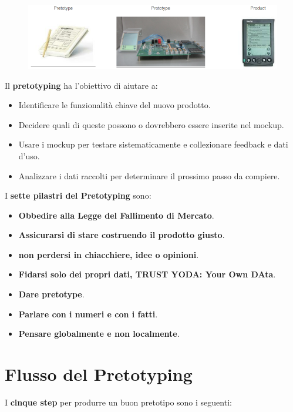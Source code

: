 \documentclass[a4paper,11pt,oneside]{book}
\begin{document}
\pagebreak

\begin{figure}[!h]
	\centering
	\includegraphics[scale=0.65]{immagini/Pre_prot.png}
\end{figure}

Il \textbf{pretotyping} ha l'obiettivo di aiutare a:

\begin{itemize}
	\item Identificare le funzionalità chiave del nuovo prodotto.
	\item Decidere quali di queste possono o dovrebbero essere inserite nel mockup.
	\item Usare i mockup per testare sistematicamente e collezionare feedback e dati d'uso.
	\item Analizzare i dati raccolti per determinare il prossimo passo da compiere.
\end{itemize}

I \textbf{sette pilastri del Pretotyping} sono:

\begin{itemize}
	\item \textbf{Obbedire alla Legge del Fallimento di Mercato}.
	\item \textbf{Assicurarsi di stare costruendo il prodotto giusto}.
	\item \textbf{non perdersi in chiacchiere, idee o opinioni}.
	\item \textbf{Fidarsi solo dei propri dati, \textbf{TRUST YODA: Your Own DAta}}.
	\item \textbf{Dare pretotype}.
	\item \textbf{Parlare con i numeri e con i fatti}.
	\item \textbf{Pensare globalmente e non localmente}.
\end{itemize}

\section{Flusso del Pretotyping}

I \textbf{cinque step} per produrre un buon pretotipo sono i seguenti:
\end{document}
